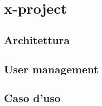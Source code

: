 \part{x-project}
	\label{seconda}
	

	\chapter{Architettura}
		\label{cha:architettura}
		


	\chapter{User management}
		\label{cha:user_management}
		

	\chapter{Caso d'uso}
		\label{cha:caso_uso}
		